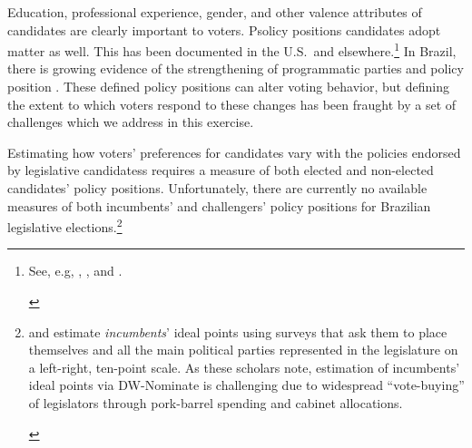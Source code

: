 \documentclass[12pt,english]{article}
\newcommand{\note}[1]{\footnote{ \begin{doublespace}#1  \end{doublespace}}}
\numberwithin{equation}{section}
\theoremstyle{plain}
\theoremstyle{remark}
\theoremstyle{plain}
\begin{document}
Education, professional experience, gender, and other valence attributes of candidates are clearly important to voters. Psolicy positions candidates adopt matter as well. This has been documented in the U.S.\ and elsewhere.\note{\normalsize See, e.g, , \citeasnoun{AnsolabehereJones2010}, and \citeasnoun{Iaryczoweretal2018}.} In Brazil, there is growing evidence of the strengthening of programmatic parties and policy position . These defined policy positions can alter voting behavior, but defining the extent to which voters respond to these changes has been fraught by a set of challenges which we address in this exercise.

Estimating how voters' preferences for candidates vary with the policies endorsed by legislative candidatess requires a measure of both elected and non-elected candidates' policy positions. Unfortunately, there are currently no available measures of both incumbents' and challengers' policy positions for Brazilian legislative elections.\note{\normalsize {} and \citeasnoun{ZuccoLauderdale2011} estimate \emph{incumbents}' ideal points using surveys that ask them to place themselves and all the main political parties represented in the legislature on a left-right, ten-point scale. As these scholars note, estimation of incumbents' ideal points via DW-Nominate is challenging due to widespread ``vote-buying'' of legislators through pork-barrel spending and cabinet allocations.} %
\end{document}
